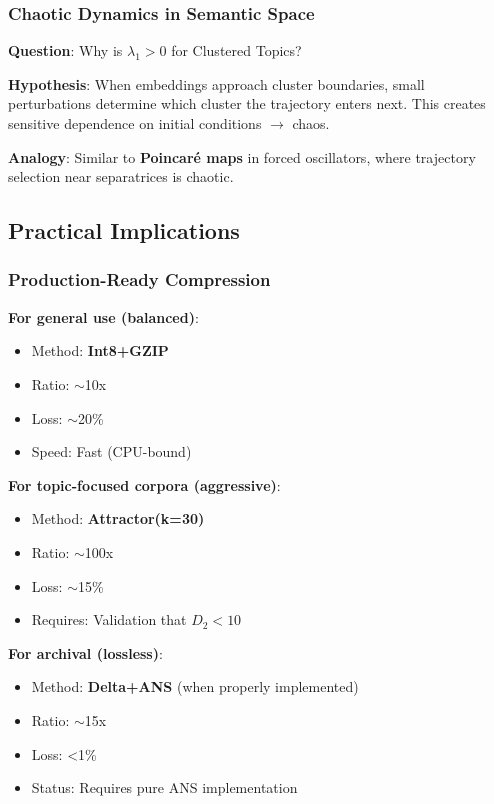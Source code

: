 \documentclass[11pt,a4paper]{article}
\begin{document}
\subsubsection{Chaotic Dynamics in Semantic Space}

\textbf{Question}: Why is $\lambda_1 > 0$ for Clustered Topics?

\textbf{Hypothesis}: When embeddings approach cluster boundaries, small perturbations determine which cluster the trajectory enters next. This creates sensitive dependence on initial conditions $\to$ chaos.

\textbf{Analogy}: Similar to \textbf{Poincar\'e maps} in forced oscillators, where trajectory selection near separatrices is chaotic.

\subsection{Practical Implications}

\subsubsection{Production-Ready Compression}

\textbf{For general use (balanced)}:
\begin{itemize}
\item Method: \textbf{Int8+GZIP}
\item Ratio: $\sim$10x
\item Loss: $\sim$20\%
\item Speed: Fast (CPU-bound)
\end{itemize}

\textbf{For topic-focused corpora (aggressive)}:
\begin{itemize}
\item Method: \textbf{Attractor(k=30)}
\item Ratio: $\sim$100x
\item Loss: $\sim$15\%
\item Requires: Validation that $D_2 < 10$
\end{itemize}

\textbf{For archival (lossless)}:
\begin{itemize}
\item Method: \textbf{Delta+ANS} (when properly implemented)
\item Ratio: $\sim$15x
\item Loss: <1\%
\item Status: Requires pure ANS implementation
\end{itemize}
\end{document}
